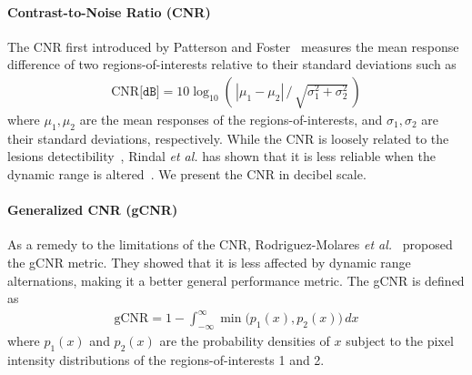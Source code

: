 
%
\paragraph{Contrast-to-Noise Ratio (CNR)}
The CNR first introduced by Patterson and Foster~\cite{patterson_improvement_1983} measures the mean response difference of two regions-of-interests relative to their standard deviations such as
\begin{align}
  \mathrm{CNR} \texttt{[dB]} = 10 \log_{10} \left(\,| \mu_{1} - \mu_{2} | \,/\, \sqrt{\sigma^2_1 + \sigma^2_2}\, \right)
\end{align}
where \(\mu_1, \mu_2\) are the mean responses of the regions-of-interests, and \(\sigma_1, \sigma_2\) are their standard deviations, respectively.
While the CNR is loosely related to the lesions detectibility~\cite{smith_ultrasound_1984}, Rindal \textit{et al.} has shown that it is less reliable when the dynamic range is altered~\cite{rindal_effect_2019}.
We present the CNR in decibel scale.


\paragraph{Generalized CNR (gCNR)}
As a remedy to the limitations of the CNR, Rodriguez-Molares \textit{et al.}~\cite{rodriguez-molares_generalized_2020} proposed the gCNR metric.
They showed that it is less affected by dynamic range alternations, making it a better general performance metric.
The gCNR is defined as
\begin{align}
  \text{gCNR} = 1 - \int_{-\infty}^{\infty} \min\big(p_1\left(x\right), p_2\left(x\right)\big) \, dx
\end{align}
where \(p_1\left(x\right)\) and \(p_2\left(x\right)\) are the probability densities of \(x\) subject to the pixel intensity distributions of the regions-of-interests 1 and 2.

